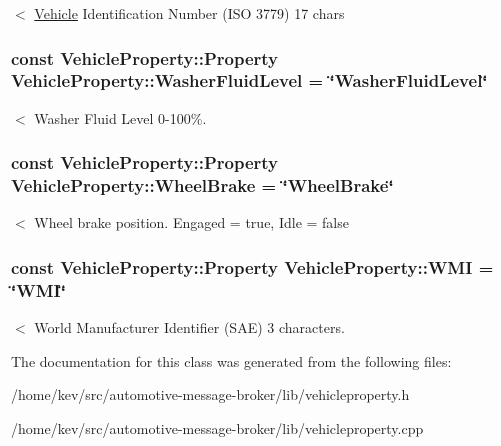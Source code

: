 $<$ \hyperlink{namespaceVehicle}{Vehicle} Identification Number (I\-S\-O 3779) 17 chars \hypertarget{classVehicleProperty_a37c8c7e827625705d2f560ab53ee8d23}{
\subsubsection[{Washer\-Fluid\-Level}]{\setlength{\rightskip}{0pt plus 5cm}const Vehicle\-Property\-::\-Property Vehicle\-Property\-::\-Washer\-Fluid\-Level = \char`\"{}Washer\-Fluid\-Level\char`\"{}\hspace{0.3cm}{\ttfamily [static]}}}\label{classVehicleProperty_a37c8c7e827625705d2f560ab53ee8d23}
$<$ Washer Fluid Level 0-\/100\%. \hypertarget{classVehicleProperty_ad4f1ec038bee5ef30fbf8308aaba2794}{
\subsubsection[{Wheel\-Brake}]{\setlength{\rightskip}{0pt plus 5cm}const Vehicle\-Property\-::\-Property Vehicle\-Property\-::\-Wheel\-Brake = \char`\"{}Wheel\-Brake\char`\"{}\hspace{0.3cm}{\ttfamily [static]}}}\label{classVehicleProperty_ad4f1ec038bee5ef30fbf8308aaba2794}
$<$ Wheel brake position. Engaged = true, Idle = false \hypertarget{classVehicleProperty_a32f980d900d97cf94171ea9fa25408e0}{
\subsubsection[{W\-M\-I}]{\setlength{\rightskip}{0pt plus 5cm}const Vehicle\-Property\-::\-Property Vehicle\-Property\-::\-W\-M\-I = \char`\"{}W\-M\-I\char`\"{}\hspace{0.3cm}{\ttfamily [static]}}}\label{classVehicleProperty_a32f980d900d97cf94171ea9fa25408e0}
$<$ World Manufacturer Identifier (S\-A\-E) 3 characters. 

The documentation for this class was generated from the following files\-:\begin{DoxyCompactItemize}
\item 
/home/kev/src/automotive-\/message-\/broker/lib/vehicleproperty.\-h\item 
/home/kev/src/automotive-\/message-\/broker/lib/vehicleproperty.\-cpp\end{DoxyCompactItemize}

